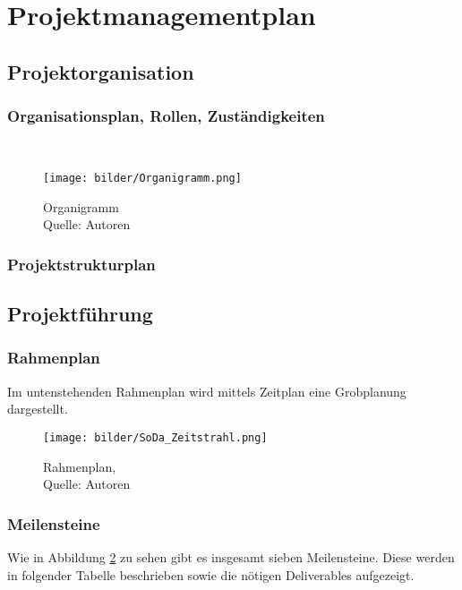 \documentclass[12pt,titlepage]{article}
\begin{document}
\section{Projektmanagementplan}
\subsection{Projektorganisation}
\subsubsection{Organisationsplan, Rollen, Zust\"andigkeiten}\\
\begin{figure}[htbp]
    \centering
    \texttt{[image: bilder/Organigramm.png]}
    \caption[Organigramm]{Organigramm\\ Quelle: Autoren}
    \label{img: OrganigrammWiPro}
\end{figure}

\subsubsection{Projektstrukturplan}
\subsection{Projektf\"uhrung}
\subsubsection{Rahmenplan}

Im untenstehenden Rahmenplan wird mittels Zeitplan eine Grobplanung dargestellt. 

\begin{figure}[htbp]
    \centering
    \texttt{[image: bilder/SoDa\_Zeitstrahl.png]}
    \caption[SoDa Rahmenplan]{Rahmenplan,\\ Quelle: Autoren}
    \label{img: SoDa Rahmenplan}
\end{figure}

\subsubsection{Meilensteine}
Wie in Abbildung \ref{img: SoDa Rahmenplan} zu sehen gibt es insgesamt sieben Meilensteine. Diese werden in folgender Tabelle beschrieben sowie die nötigen Deliverables aufgezeigt. 
\end{document}
